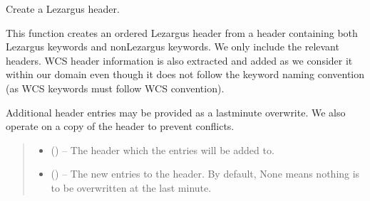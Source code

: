 \documentclass[letterpaper,11pt,english]{sphinxmanual}
\begin{document}
\begin{savenotes}\begin{fulllineitems}
\label{\detokenize{code/lezargus.library.fits:lezargus.library.fits.create_lezargus_fits_header}}
\pysigstartsignatures
{}
\pysigstopsignatures
\sphinxAtStartPar
Create a Lezargus header.

\sphinxAtStartPar
This function creates an ordered Lezargus header from a header containing
both Lezargus keywords and non\sphinxhyphen{}Lezargus keywords. We only include the
relevant headers. WCS header information is also extracted and added as
we consider it within our domain even though it does not follow the
keyword naming convention (as WCS keywords must follow WCS convention).

\sphinxAtStartPar
Additional header entries may be provided as a last\sphinxhyphen{}minute overwrite. We
also operate on a copy of the header to prevent conflicts.
\begin{quote}\begin{description}
\begin{itemize}
\item {} 
\sphinxAtStartPar
{} () – The header which the entries will be added to.

\item {} 
\sphinxAtStartPar
{} (\sphinxstyleliteralemphasis{\sphinxupquote{, }}) – The new entries to the header. By default, None means nothing is
to be overwritten at the last minute.


\end{itemize}
\end{description}
\end{quote}
\end{fulllineitems}
\end{savenotes}
\end{document}
